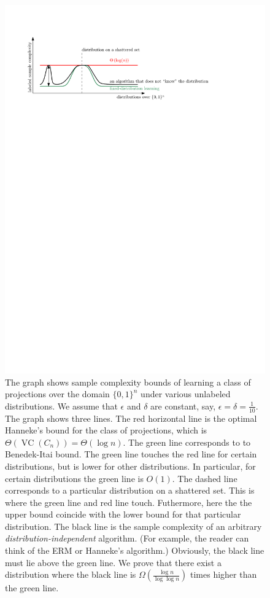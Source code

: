 \documentclass[10pt]{article}
\DeclareMathOperator{\VC}{VC}
\begin{document}
\begin{figure}
\centering
\includegraphics{figure}
\caption{The graph shows sample complexity bounds of learning a class of
projections over the domain $\{0,1\}^n$ under various unlabeled distributions.
We assume that $\epsilon$ and $\delta$ are constant, say, $\epsilon = \delta =
\frac{1}{10}$. The graph shows three lines. The red horizontal line is the
optimal Hanneke's bound for the class of projections, which is
$\Theta(\VC(C_n)) = \Theta(\log n)$. The green line corresponds to to
Benedek-Itai bound. The green line touches the red line for certain
distributions, but is lower for other distributions. In particular, for certain
distributions the green line is $O(1)$. The dashed line corresponds
to a particular distribution on a shattered set. This is where the green line
and red line touch. Futhermore, here the the upper bound coincide
with the lower bound for that particular distribution.
The black line is the sample complexity
of an arbitrary \emph{distribution-independent} algorithm. (For example, the
reader can think of the ERM or Hanneke's algorithm.) Obviously, the black line
must lie above the green line. We prove that there exist a distribution where
the black line is $\Omega(\frac{\log n}{\log \log n})$ times higher than the
green line.} \label{figure:sample-complexity}
\end{figure}
\end{document}
